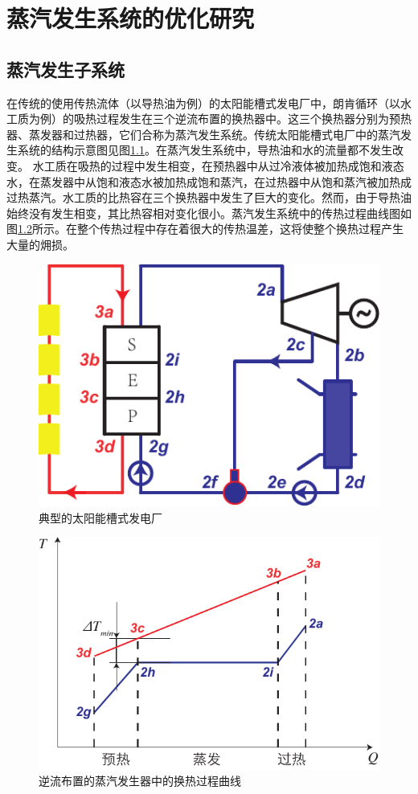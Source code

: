 \chapter{蒸汽发生系统的优化研究}
\label{cha:osgs}
\section{蒸汽发生子系统}

在传统的使用传热流体（以导热油为例）的太阳能槽式发电厂中，朗肯循环（以水工质为例）的吸热过程发生在三个逆流布置的换热器中。这三个换热器分别为预热器、蒸发器和过热器，它们合称为蒸汽发生系统。传统太阳能槽式电厂中的蒸汽发生系统的结构示意图见图\ref{fig:PTC}。在蒸汽发生系统中，导热油和水的流量都不发生改变。
水工质在吸热的过程中发生相变，在预热器中从过冷液体被加热成饱和液态水，在蒸发器中从饱和液态水被加热成饱和蒸汽，在过热器中从饱和蒸汽被加热成过热蒸汽。水工质的比热容在三个换热器中发生了巨大的变化。然而，由于导热油始终没有发生相变，其比热容相对变化很小。蒸汽发生系统中的传热过程曲线图如图\ref{fig:DeltaTmin}所示。在整个传热过程中存在着很大的传热温差，这将使整个换热过程产生大量的㶲损。

\noindent \begin{figure}[htbp]
\begin{center}
	\includegraphics[width = 0.4\columnwidth]{fig/PTC}
	\caption{典型的太阳能槽式发电厂}
	\label{fig:PTC}
\end{center}
\end{figure}

\noindent \begin{figure}[htbp]
\begin{center}
	\includegraphics[width = 0.5\columnwidth]{fig/DeltaTmin}
	\caption{逆流布置的蒸汽发生器中的换热过程曲线}
	\label{fig:DeltaTmin}
\end{center}
\end{figure}


